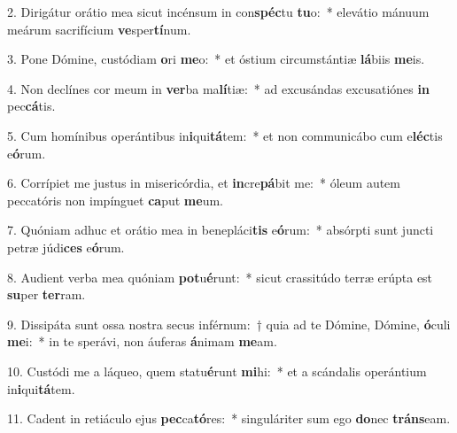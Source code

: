 \item 2. Dirigátur orátio mea sicut incénsum in con\textbf{spéc}tu \textbf{tu}o:~* elevátio mánuum meárum sacrifícium \textbf{ve}sper\textbf{tí}num.
\item 3. Pone Dómine, custódiam \textbf{o}ri \textbf{me}o:~* et óstium circumstántiæ \textbf{lá}biis \textbf{me}is.
\item 4. Non declínes cor meum in \textbf{ver}ba ma\textbf{lí}tiæ:~* ad excusándas excusatiónes \textbf{in} pec\textbf{cá}tis.
\item 5. Cum homínibus operántibus in\textbf{i}qui\textbf{tá}tem:~* et non communicábo cum e\textbf{léc}tis e\textbf{ó}rum.
\item 6. Corrípiet me justus in misericórdia, et \textbf{in}cre\textbf{pá}bit me:~* óleum autem peccatóris non impínguet \textbf{ca}put \textbf{me}um.
\item 7. Quóniam adhuc et orátio mea in benepláci\textbf{tis} e\textbf{ó}rum:~* absórpti sunt jun\-cti petræ júdi\textbf{ces} e\textbf{ó}rum.
\item 8. Audient verba mea quóniam \textbf{pot}u\textbf{é}runt:~* sicut crassitúdo terræ erúpta est \textbf{su}per \textbf{ter}ram.
\item 9. Dissipáta sunt ossa nostra secus inférnum:~† quia ad te Dómine, Dómine, \textbf{ó}culi \textbf{me}i:~* in te sperávi, non áuferas \textbf{á}nimam \textbf{me}am.
\item 10. Custódi me a láqueo, quem statu\textbf{é}runt \textbf{mi}hi:~* et a scándalis operántium in\textbf{i}qui\textbf{tá}tem.
\item 11. Cadent in retiáculo ejus \textbf{pec}ca\textbf{tó}res:~* singuláriter sum ego \textbf{do}nec \textbf{tráns}eam.
